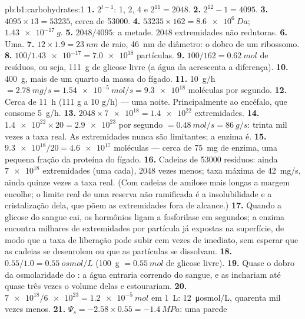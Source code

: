 \begin{solution}{pb:b1:carbohydrates:1}
\textbf{1.} $2^{t-1}$: 1, 2, 4 e $2^{11} = 2048$.
\textbf{2.} $2^{12} - 1 = 4095$.
\textbf{3.} $4095\times 13 = \num{53235}$, cerca de \num{53000}.
\textbf{4.} $\num{53235}\times 162 = \qty{8.6e6}{Da}$;
$\qty{1.43e-17}{g}$.
\textbf{5.} $2048/4095$: a metade. \num{2048} extremidades não
redutoras.
\textbf{6.} Uma.
\textbf{7.} $12\times 1.9 = \qty{23}{nm}$ de raio, \qty{46}{nm} de
diâmetro: o dobro de um ribossomo.
\textbf{8.} $100/\num{1.43e-17} = \num{7.0e18}$ partículas.
\textbf{9.} $100/162 = \qty{0.62}{mol}$ de resíduos, ou seja,
\qty{111}{g} de glicose livre (a água da  acrescenta a
diferença).
\textbf{10.} \qty{400}{g}, mais de um quarto da massa do fígado.
\textbf{11.} \qty{10}{g/h} $= \qty{2.78}{mg/s} = \qty{1.54e-5}{mol/s} =
\num{9.3e18}$ moléculas por segundo.
\textbf{12.} Cerca de \qty{11}{h} (111 g a 10 g/h) --- uma noite.
Principalmente ao encéfalo, que consome \qty{5}{g/h}.
\textbf{13.} $2048\times\num{7e18} = \num{1.4e22}$ extremidades.
\textbf{14.} $\num{1.4e22}\times 20 = \num{2.9e23}$ por segundo $=
\qty{0.48}{mol/s} = \qty{86}{g/s}$: trinta mil vezes a taxa real. As
extremidades nunca são limitantes; a enzima é.
\textbf{15.} $\num{9.3e18}/20 = \num{4.6e17}$ moléculas --- cerca de
\qty{75}{mg} de enzima, uma pequena fração da proteína do fígado.
\textbf{16.} Cadeias de \num{53000} resíduos: ainda $\num{7e18}$
extremidades (uma cada), \num{2048} vezes menos; taxa máxima de
\qty{42}{mg/s}, ainda quinze vezes a taxa real. (Com cadeias de amilose
mais longas a margem encolhe; o limite real de uma reserva não
ramificada é a insolubilidade e a cristalização dela, que põem as
extremidades fora de alcance.)
\textbf{17.} Quando a glicose do sangue cai, os hormônios ligam a
fosforilase em segundos; a enzima encontra milhares de extremidades por
partícula já expostas na superfície, de modo que a taxa de liberação
pode subir cem vezes de imediato, sem esperar que as cadeias se
desenrolem ou que as partículas se dissolvam.
\textbf{18.} $0.55/1.0 = \qty{0.55}{osmol/L}$ (\qty{100}{g}
$= \qty{0.55}{mol}$ de glicose livre).
\textbf{19.} Quase o dobro da osmolaridade do : a água entraria
correndo do sangue, e as  inchariam até quase três vezes o volume
delas e estourariam.
\textbf{20.} $\num{7e18}/\num{6e23} = \qty{1.2e-5}{mol}$ em \qty{1}{L}:
\qty{12}{\micro osmol/L}, quarenta mil vezes menos.
\textbf{21.} $\Psi_s = -2.58\times 0.55 = \qty{-1.4}{MPa}$: uma parede

\end{solution}
